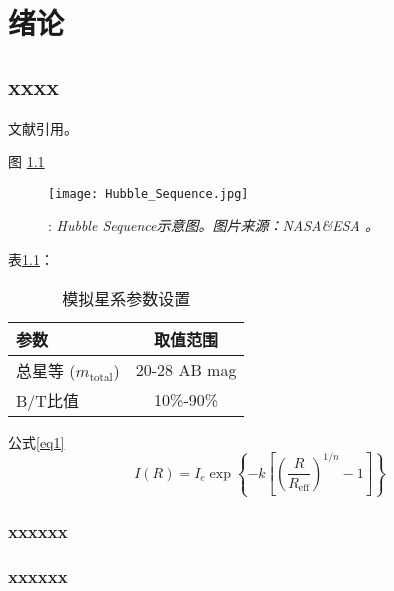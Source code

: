 \chapter{绪论}
\section{xxxx}
文献引用\cite{Kormendy2004,Sandage2005,mo2010}。

图 \ref{fig:hubble_sequence}
\begin{figure}[htbp]
\centering
\texttt{[image: Hubble\_Sequence.jpg]}
\caption{: \emph{Hubble Sequence示意图。图片来源：NASA\&ESA 。}}
\label{fig:hubble_sequence}
\end{figure}

表\ref{tab:simulation_parameters}：
\begin{table}[htbp]
\centering
\caption{模拟星系参数设置}
\label{tab:simulation_parameters}
\begin{tabular}{lc}
\hline
\hline
\textbf{参数} & \textbf{取值范围} \\
\hline
总星等 ($m_{\text{total}}$) & 20-28 AB mag \\
B/T比值 & 10\%-90\% \\
\hline
\hline
\end{tabular}
\end{table}

公式\ref{eq1}
\begin{equation}
I(R) = I_e \exp\left\{-k\left[\left(\frac{R}{R_{\text{eff}}}\right)^{1/n} - 1\right]\right\}
\label{eq1}
\end{equation}


\subsection{xxxxxx}

\subsection{xxxxxx}

